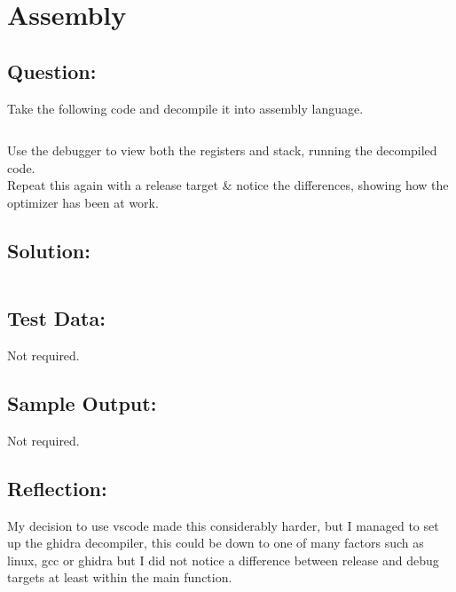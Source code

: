 \documentclass[Lab-B.tex]{subfiles}
\begin{document}
    \section{Assembly}
        \subsection*{Question:}
            Take the following code and decompile it into assembly language.

            \inputminted{cpp}{../03-Assembly/Assembly.cpp}

            Use the debugger to view both the registers and stack, 
            running the decompiled code.\\

            Repeat this again with a release target \& notice the differences,
            showing how the optimizer has been at work.

        \subsection*{Solution:}
            {\renewcommand\fcolorbox[4][]{\textcolor{cyan}{\strut#4}}
                \inputminted{gas}{../03-Assembly/Assembly.txt}%
            }
        \subsection*{Test Data:}
            Not required.
        
        \subsection*{Sample Output:}
            Not required.
        \subsection*{Reflection:}
            My decision to use vscode made this considerably harder, but I managed to set up
            the ghidra decompiler, this could be down to one of many factors such as linux, gcc or ghidra
            but I did not notice a difference between release and debug targets at least within the main function.
\end{document}
